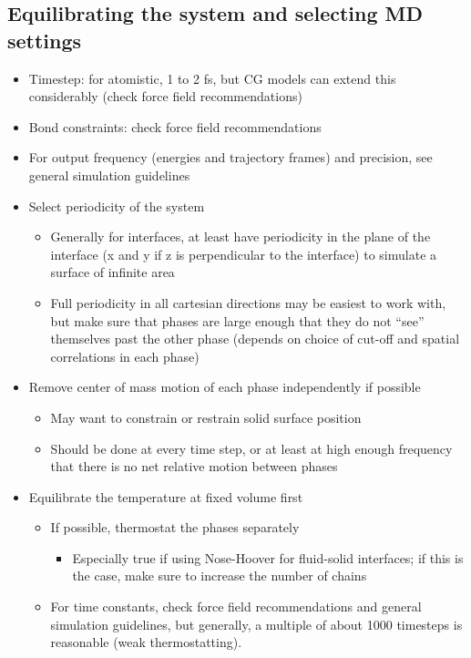 \documentclass[9pt]{livecoms}
\begin{document}
\subsection{Equilibrating the system and selecting MD settings}
\label{subsec:mainEq}

\begin{itemize}
	\item Timestep: for atomistic, 1 to 2 fs, but CG models can extend this considerably (check force field recommendations)
	\item Bond constraints: check force field recommendations
	\item For output frequency (energies and trajectory frames) and precision, see general simulation guidelines
	\item Select periodicity of the system
	\begin{itemize}
		\item Generally for interfaces, at least have periodicity in the plane of the interface (x and y if z is perpendicular to the interface) to simulate a surface of infinite area
		\item Full periodicity in all cartesian directions may be easiest to work with, but make sure that phases are large enough that they do not “see” themselves past the other phase (depends on choice of cut-off and spatial correlations in each phase)
	\end{itemize}
	\item Remove center of mass motion of each phase independently if possible
	\begin{itemize}
		\item May want to constrain or restrain solid surface position
		\item Should be done at every time step, or at least at high enough frequency that there is no net relative motion between phases
	\end{itemize}
	\item Equilibrate the temperature at fixed volume first
	\begin{itemize}
		\item If possible, thermostat the phases separately
		\begin{itemize}
			\item Especially true if using Nose-Hoover for fluid-solid interfaces; if this is the case, make sure to increase the number of chains
		\end{itemize}
		\item For time constants, check force field recommendations and general simulation guidelines, but generally, a multiple of about 1000 timesteps is reasonable (weak thermostatting).

\end{itemize}
\end{itemize}
\end{document}
